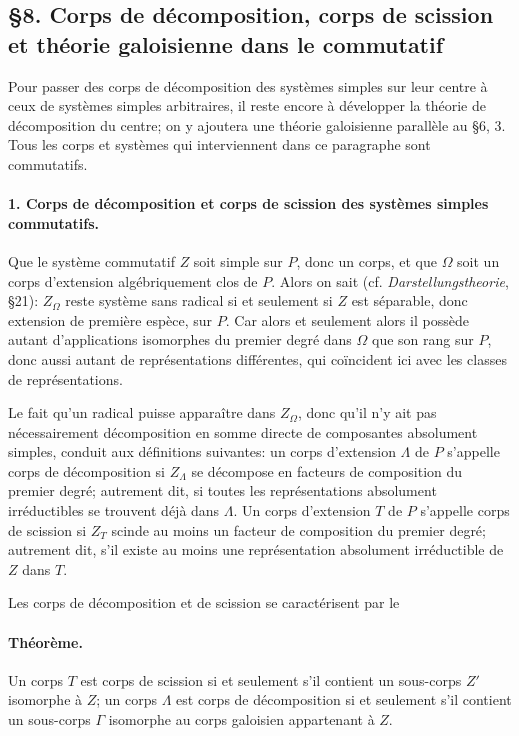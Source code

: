 \providecommand{\Gcal}{\mathcal G}
\providecommand{\Sp}{\operatorname{Sp}}

\subsection*{\S 8. Corps de décomposition, corps de scission et théorie galoisienne dans le commutatif}

Pour passer des corps de décomposition des systèmes simples sur leur centre à ceux de systèmes simples arbitraires, il reste encore à développer la théorie de décomposition du centre; on y ajoutera une théorie galoisienne parallèle au \S 6, 3. Tous les corps et systèmes qui interviennent dans ce paragraphe sont commutatifs.

\paragraph{1. Corps de décomposition et corps de scission des systèmes simples commutatifs.}
Que le système commutatif \(Z\) soit simple sur \(P\), donc un corps, et que \(\Omega\) soit un corps d'extension algébriquement clos de \(P\). Alors on sait (cf. \emph{Darstellungstheorie}, \S 21): \(Z_\Omega\) reste système sans radical si et seulement si \(Z\) est séparable, donc extension de première espèce, sur \(P\). Car alors et seulement alors il possède autant d'applications isomorphes du premier degré dans \(\Omega\) que son rang sur \(P\), donc aussi autant de représentations différentes, qui coïncident ici avec les classes de représentations.

Le fait qu'un radical puisse apparaître dans \(Z_\Omega\), donc qu'il n'y ait pas nécessairement décomposition en somme directe de composantes absolument simples, conduit aux définitions suivantes: un corps d'extension \(\Lambda\) de \(P\) s'appelle corps de décomposition si \(Z_\Lambda\) se décompose en facteurs de composition du premier degré; autrement dit, si toutes les représentations absolument irréductibles se trouvent déjà dans \(\Lambda\). Un corps d'extension \(T\) de \(P\) s'appelle corps de scission si \(Z_T\) scinde au moins un facteur de composition du premier degré; autrement dit, s'il existe au moins une représentation absolument irréductible de \(Z\) dans \(T\).

Les corps de décomposition et de scission se caractérisent par le

\paragraph{Théorème.}
Un corps \(T\) est corps de scission si et seulement s'il contient un sous-corps \(Z'\) isomorphe à \(Z\); un corps \(\Lambda\) est corps de décomposition si et seulement s'il contient un sous-corps \(\Gamma\) isomorphe au corps galoisien appartenant à \(Z\).

